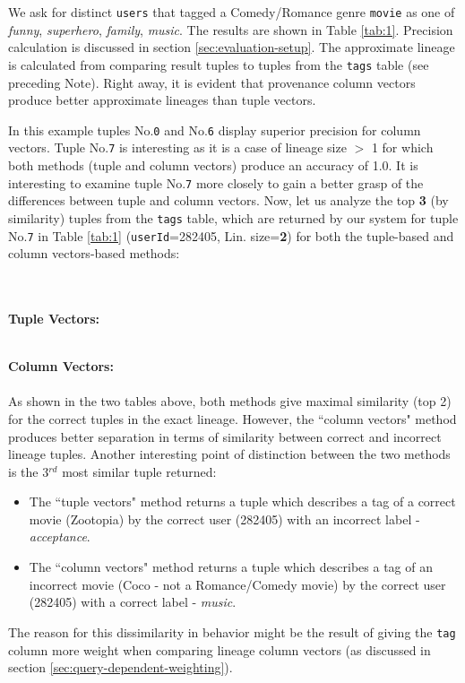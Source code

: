 % 
\begin{example-withrun}\label{experiment:1}



We ask for distinct \texttt{users} that tagged a Comedy/Romance genre \texttt{movie} as one of \textit{funny}, \textit{superhero}, \textit{family}, \textit{music}. The results are shown in Table \ref{tab:1}. Precision calculation is discussed in section \ref{sec:evaluation-setup}. The approximate lineage is calculated from comparing result tuples to tuples from the \texttt{tags} table (see preceding Note). Right away, it is evident that provenance column vectors produce better approximate lineages than tuple vectors.\\
\par In this example tuples No.\texttt{0} and No.\texttt{6} display superior precision for column vectors. Tuple No.\texttt{7} is  interesting as it is a case of lineage size $>$ 1 for which both methods (tuple and column vectors) produce an accuracy of 1.0.
It is interesting to examine tuple No.\texttt{7} more closely to gain a better grasp of the differences between tuple and column vectors.
Now, let us analyze the top \textbf{3} (by similarity) tuples from the \texttt{tags} table, which are returned by our system for tuple No.\texttt{7} in Table \ref{tab:1} (\texttt{userId}=282405, Lin. size=\textbf{2}) for both the tuple-based and column vectors-based methods:\\\\\\
\par\textbf{Tuple Vectors:}\\
\\
\par\textbf{Column Vectors:}\\

\\
As shown in the two tables above, both methods give maximal similarity (top 2) for the correct tuples in the exact lineage. However, the ``column vectors" method produces better separation in terms of similarity between correct and incorrect lineage tuples. Another interesting point of distinction between the two methods is the 3$^{rd}$ most similar tuple returned:
\begin{itemize}
    \item The ``tuple vectors" method returns a tuple which describes a tag of a correct movie (Zootopia) by the correct user (282405) with an incorrect label - \textit{acceptance}.
    \item The ``column vectors" method returns a tuple which describes a tag of an incorrect movie (Coco - not a Romance/Comedy movie) by the correct user (282405) with a correct label - \textit{music}.
\end{itemize}
The reason for this dissimilarity in behavior might be the result of giving the \texttt{tag} column more weight when comparing lineage column vectors (as discussed in section \ref{sec:query-dependent-weighting}).

\end{example-withrun}


